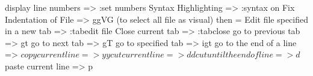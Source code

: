 display line numbers => :set numbers
Syntax Highlighting => :syntax on
Fix Indentation of File => ggVG (to select all file as visual) then =
Edit file specified in a new tab => :tabedit {file}
Close current tab => :tabclose
go to previous tab => gt
go to next tab => gT
go to specified tab => {i}gt
go to the end of a line => $
copy current line => yy
cut current line => dd
cut until the end of line => d$
paste current line => p

